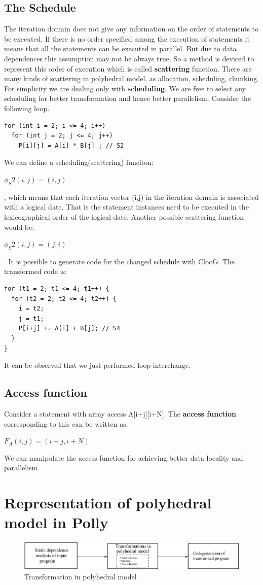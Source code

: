 \subsection{The Schedule}

The iteration domain does not give any information on the order of statements to be executed. If there
is no order specified among the execution of statements it means that all the statements can be executed
in parallel. But due to data dependences this assumption may not be always true. So a method is deviced
to represent this order of execution which is called \textbf{scattering} function. There are many
kinds of scattering in polyhedral model, as allocation, scheduling, chunking. For simplicity
we are dealing only with \textbf{scheduling}. We are free to select any scheduling for better
transformation and hence better parallelism.
Consider the following loop.
{\footnotesize
\begin{lstlisting}
for (int i = 2; i <= 4; i++)
  for (int j = 2; j <= 4; j++)
    P[i][j] = A[i] * B[j] ; // S2
\end{lstlisting}
}
We can define a scheduling(scattering) funciton:
\begin{center}
$\phi_S2(i,j) = (i,j)$
\end{center}, which means that each iteration vector (i,j) in the iteration domain is associated with
a logical date. That is the statement instances need to be executed in the lexicographical order of the
logical date. Another possible scattering function would be:
\begin{center}
$\phi_S2(i,j) = (j,i)$
\end{center}. It is possible to generate code for the changed schedule with ClooG\cite{cloog}. The
transformed code is:
{\footnotesize
\begin{lstlisting}
for (t1 = 2; t1 <= 4; t1++) {
  for (t2 = 2; t2 <= 4; t2++) {
    i = t2;
    j = t1;
    P[i+j] += A[i] + B[j]; // S4
  }
}
\end{lstlisting}
}
It can be observed that we just performed loop interchange.

\subsection{Access function}
Consider a statement with array access A[i+j][i+N]. The \textbf{access function} corresponding to this can be written
as:
\begin{center}
$F_A(i,j) = (i+j,i+N)$
\end{center}
We can manipulate the access function for achieving better data locality and parallelism.
\section{Representation of polyhedral model in Polly}
\begin{figure}
  \label{fig:poly_steps}
  \includegraphics[width=1\textwidth]{images/poly_steps.eps}
  \caption{Transformation in polyhedral model}
\end{figure}
